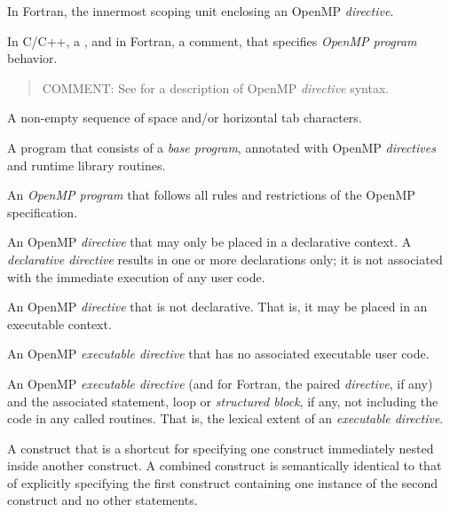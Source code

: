 In Fortran, the innermost scoping unit enclosing an OpenMP \emph{directive}.
\glossarydefend

\glossarydefstart
In C/C++, a , and in Fortran, a comment, that specifies \emph{OpenMP
program} behavior.

\begin{quote}
COMMENT: See  for a description of OpenMP \emph{directive} syntax.
\end{quote}
\glossarydefend


\glossarydefstart
A non-empty sequence of space and/or horizontal tab characters.
\glossarydefend

\glossarydefstart
A program that consists of a \emph{base program}, annotated with OpenMP \emph{directives} and 
runtime library routines.
\glossarydefend

\glossarydefstart
An \emph{OpenMP program} that follows all rules and restrictions of the OpenMP 
specification.
\glossarydefend

\glossarydefstart
An OpenMP \emph{directive} that may only be placed in a declarative context. A 
\emph{declarative directive} results in one or more declarations only; it is not associated 
with the immediate execution of any user code.
\glossarydefend

\glossarydefstart
An OpenMP \emph{directive} that is not declarative. That is, it may be placed in an 
executable context.
\glossarydefend

\glossarydefstart
An OpenMP \emph{executable directive} that has no associated executable user code.
\glossarydefend


\glossarydefstart
An OpenMP \emph{executable directive} (and for Fortran, the paired  \emph{directive}, if 
any) and the associated statement, loop or \emph{structured block}, if any, not including 
the code in any called routines. That is, the lexical extent of an \emph{executable 
directive}.
\glossarydefend

\glossarydefstart
A construct that is a shortcut for specifying one construct immediately nested inside another construct. A combined construct is semantically identical to that of explicitly specifying the first construct containing one instance of the second construct and no other statements.
\glossarydefend

